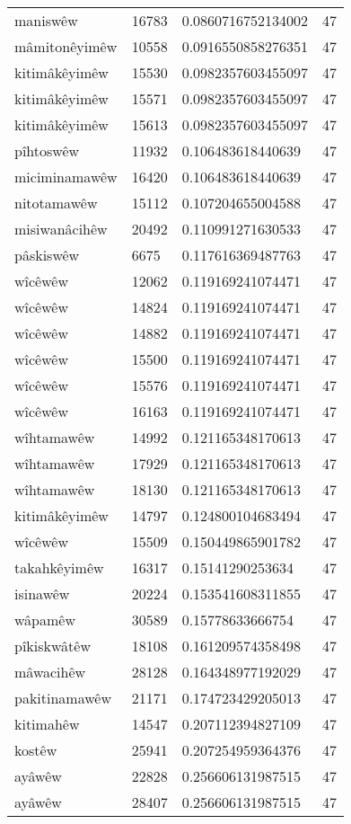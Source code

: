 \begin{longtable}{llll}
maniswêw & 16783 & 0.0860716752134002 & 47\\
mâmitonêyimêw & 10558 & 0.0916550858276351 & 47\\
kitimâkêyimêw & 15530 & 0.0982357603455097 & 47\\
kitimâkêyimêw & 15571 & 0.0982357603455097 & 47\\
kitimâkêyimêw & 15613 & 0.0982357603455097 & 47\\
pîhtoswêw & 11932 & 0.106483618440639 & 47\\
miciminamawêw & 16420 & 0.106483618440639 & 47\\
nitotamawêw & 15112 & 0.107204655004588 & 47\\
misiwanâcihêw & 20492 & 0.110991271630533 & 47\\
pâskiswêw & 6675 & 0.117616369487763 & 47\\
wîcêwêw & 12062 & 0.119169241074471 & 47\\
wîcêwêw & 14824 & 0.119169241074471 & 47\\
wîcêwêw & 14882 & 0.119169241074471 & 47\\
wîcêwêw & 15500 & 0.119169241074471 & 47\\
wîcêwêw & 15576 & 0.119169241074471 & 47\\
wîcêwêw & 16163 & 0.119169241074471 & 47\\
wîhtamawêw & 14992 & 0.121165348170613 & 47\\
wîhtamawêw & 17929 & 0.121165348170613 & 47\\
wîhtamawêw & 18130 & 0.121165348170613 & 47\\
kitimâkêyimêw & 14797 & 0.124800104683494 & 47\\
wîcêwêw & 15509 & 0.150449865901782 & 47\\
takahkêyimêw & 16317 & 0.15141290253634 & 47\\
isinawêw & 20224 & 0.153541608311855 & 47\\
wâpamêw & 30589 & 0.15778633666754 & 47\\
pîkiskwâtêw & 18108 & 0.161209574358498 & 47\\
mâwacihêw & 28128 & 0.164348977192029 & 47\\
pakitinamawêw & 21171 & 0.174723429205013 & 47\\
kitimahêw & 14547 & 0.207112394827109 & 47\\
kostêw & 25941 & 0.207254959364376 & 47\\
ayâwêw & 22828 & 0.256606131987515 & 47\\
ayâwêw & 28407 & 0.256606131987515 & 47\\

\end{longtable}
